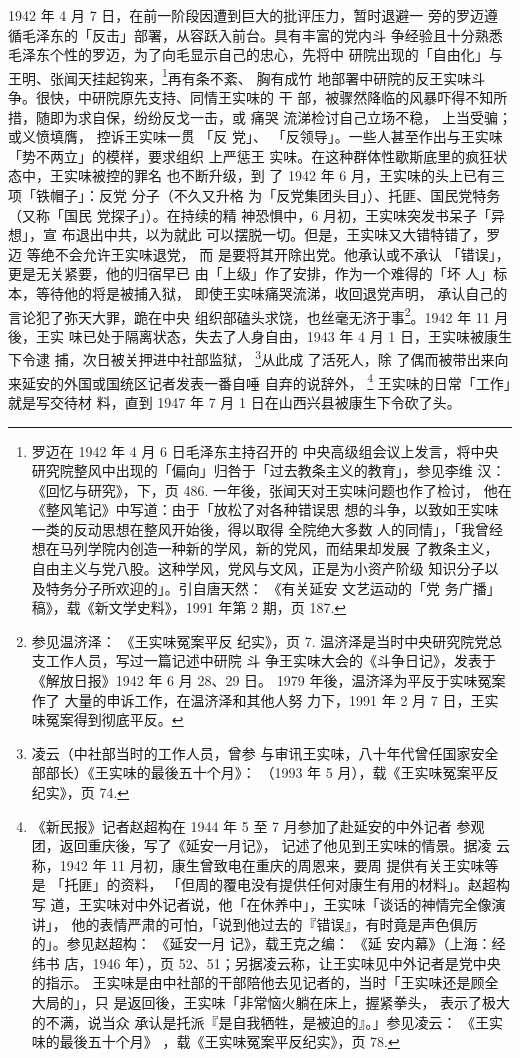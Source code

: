 1942 年 4 月 7 日，在前一阶段因遭到巨大的批评压力，暂时退避一 旁的罗迈遵
循毛泽东的「反击」部署，从容跃入前台。具有丰富的党内斗 争经验且十分熟悉
毛泽东个性的罗迈，为了向毛显示自己的忠心，先将中 研院出现的「自由化」与
王明、张闻天挂起钩来，\footnote{罗迈在 1942 年 4 月 6 日毛泽东主持召开的
中央高级组会议上发言，将中央研究院整风中出现的「偏向」归咎于「过去教条主义的教育」，参见李维
汉： 《回忆与研究》，下，页 486. 一年後，张闻天对王实味问题也作了检讨，
他在 《整风笔记》中写道：由于「放松了对各种错误思
想的斗争，以致如王实味一类的反动思想在整风开始後，得以取得 全院绝大多数
人的同情」，「我曾经想在马列学院内创造一种新的学风，新的党风，而结果却发展
了教条主义，自由主义与党八股。这种学风，党风与文风，正是为小资产阶级
知识分子以及特务分子所欢迎的」。引自唐天然： 《有关延安 文艺运动的「党
务广播」稿》，载《新文学史料》，1991 年第 2 期，页 187.  }再有条不紊、
胸有成竹 地部署中研院的反王实味斗争。很快，中研院原先支持、同情王实味的
干 部，被骤然降临的风暴吓得不知所措，随即为求自保，纷纷反戈一击，或 痛哭
流涕检讨自己立场不稳， 上当受骗； 或义愤填膺， 控诉王实味一贯 「反 党」、
「反领导」。一些人甚至作出与王实味「势不两立」的模样，要求组织 上严惩王
实味。在这种群体性歇斯底里的疯狂状态中，王实味被控的罪名 也不断升级，到
了 1942 年 6 月，王实味的头上已有三项「铁帽子」：反党 分子（不久又升格
为「反党集团头目」）、托匪、国民党特务（又称「国民 党探子」）。在持续的精
神恐惧中，6 月初，王实味突发书呆子「异想」，宣 布退出中共，以为就此
可以摆脱一切。但是，王实味又大错特错了，罗迈 等绝不会允许王实味退党， 而
是要将其开除出党。他承认或不承认 「错误」， 更是无关紧要，他的归宿早已
由「上级」作了安排，作为一个难得的「坏 人」标本，等待他的将是被捕入狱，
即使王实味痛哭流涕，收回退党声明， 承认自己的言论犯了弥天大罪，跪在中央
组织部磕头求饶，也丝毫无济于事\footnote{参见温济泽： 《王实味冤案平反
纪实》，页 7.  温济泽是当时中央研究院党总支工作人员，写过一篇记述中研院
斗 争王实味大会的《斗争日记》，发表于《解放日报》1942 年 6 月 28、29 日。
1979 年後，温济泽为平反于实味冤案作了 大量的申诉工作，在温济泽和其他人努
力下，1991 年 2 月 7 日，王实味冤案得到彻底平反。}。1942 年 11 月後，王实
味已处于隔离状态，失去了人身自由，1943 年 4 月 1 日，王实味被康生下令逮
捕，次日被关押进中社部监狱， \footnote{凌云（中社部当时的工作人员，曾参
与审讯王实味，八十年代曾任国家安全部部长）《王实味的最後五十个月》：
（1993 年 5 月），载《王实味冤案平反纪实》，页 74.}从此成 了活死人，除
了偶而被带出来向来延安的外国或国统区记者发表一番自唾 自弃的说辞外，
\footnote{《新民报》记者赵超构在 1944 年 5 至 7 月参加了赴延安的中外记者
参观团，返回重庆後，写了《延安一月记》， 记述了他见到王实味的情景。据凌
云称，1942 年 11 月初，康生曾致电在重庆的周恩来，要周 提供有关王实味等是
「托匪」的资料， 「但周的覆电没有提供任何对康生有用的材料」。赵超构写
道，王实味对中外记者说，他「在休养中」，王实味「谈话的神情完全像演讲」，
他的表情严肃的可怕，「说到他过去的『错误』，有时竟是声色俱厉的」。参见赵超构： 《延安一月
记》，载王克之编： 《延 安内幕》（上海：经纬书
店，1946 年），页 52、51；另据凌云称，让王实味见中外记者是党中央的指示。
王实味是由中社部的干部陪他去见记者的，当时「王实味还是顾全大局的」，只
是返回後，王实味「非常恼火躺在床上，握紧拳头， 表示了极大的不满，说当众
承认是托派『是自我牺牲，是被迫的』。」参见凌云： 《王实味的最後五十个月》
，载《王实味冤案平反纪实》，页 78.  } 王实味的日常「工作」就是写交待材
料，直到 1947 年 7 月 1 日在山西兴县被康生下令砍了头。

